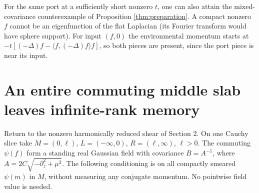\documentclass[11pt]{article}
\begin{document}
For the same port at a sufficiently short nonzero \(t\), one can also attain the mixed-covariance counterexample of Proposition \ref{thm:preparation}. A compact nonzero \(f\) cannot be an eigenfunction of the flat Laplacian (its Fourier transform would have sphere support). For input \((f,0)\) the environmental momentum starts at
\(-t[(-\Delta)f-\langle f,(-\Delta)f\rangle f]\), so both pieces are present, since the port piece is near its input.

\section{An entire commuting middle slab leaves infinite-rank memory}

Return to the nonzero harmonically reduced shear of Section 2. On one Cauchy slice take \(M=(0,\ell)\), \(L=(-\infty,0)\), \(R=(\ell,\infty)\), \(\ell>0\). The commuting \(\psi(f)\) form a standing real Gaussian field with covariance \(B=A^{-1}\), where \(A=2C\sqrt{-\partial_z^2+\mu^2}\). The following conditioning is on all compactly smeared \(\psi(m)\) in \(M\), without measuring any conjugate momentum. No pointwise field value is needed.
\end{document}
